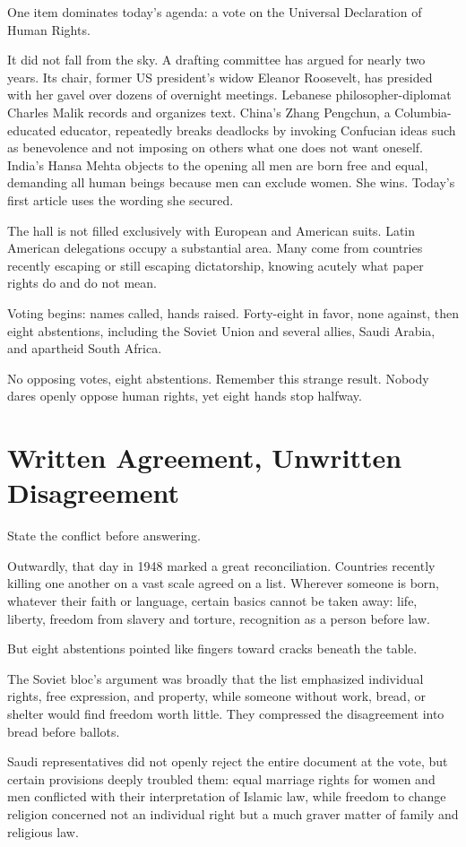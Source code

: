 One item dominates today's agenda: a vote on the Universal Declaration of Human Rights.

It did not fall from the sky. A drafting committee has argued for nearly two years. Its chair, former US president's widow Eleanor Roosevelt, has presided with her gavel over dozens of overnight meetings. Lebanese philosopher-diplomat Charles Malik records and organizes text. China's Zhang Pengchun, a Columbia-educated educator, repeatedly breaks deadlocks by invoking Confucian ideas such as benevolence and not imposing on others what one does not want oneself. India's Hansa Mehta objects to the opening all men are born free and equal, demanding all human beings because men can exclude women. She wins. Today's first article uses the wording she secured.

The hall is not filled exclusively with European and American suits. Latin American delegations occupy a substantial area. Many come from countries recently escaping or still escaping dictatorship, knowing acutely what paper rights do and do not mean.

Voting begins: names called, hands raised. Forty-eight in favor, none against, then eight abstentions, including the Soviet Union and several allies, Saudi Arabia, and apartheid South Africa.

No opposing votes, eight abstentions. Remember this strange result. Nobody dares openly oppose human rights, yet eight hands stop halfway.

\section{Written Agreement, Unwritten Disagreement}
State the conflict before answering.

Outwardly, that day in 1948 marked a great reconciliation. Countries recently killing one another on a vast scale agreed on a list. Wherever someone is born, whatever their faith or language, certain basics cannot be taken away: life, liberty, freedom from slavery and torture, recognition as a person before law.

But eight abstentions pointed like fingers toward cracks beneath the table.

The Soviet bloc's argument was broadly that the list emphasized individual rights, free expression, and property, while someone without work, bread, or shelter would find freedom worth little. They compressed the disagreement into bread before ballots.

Saudi representatives did not openly reject the entire document at the vote, but certain provisions deeply troubled them: equal marriage rights for women and men conflicted with their interpretation of Islamic law, while freedom to change religion concerned not an individual right but a much graver matter of family and religious law.

